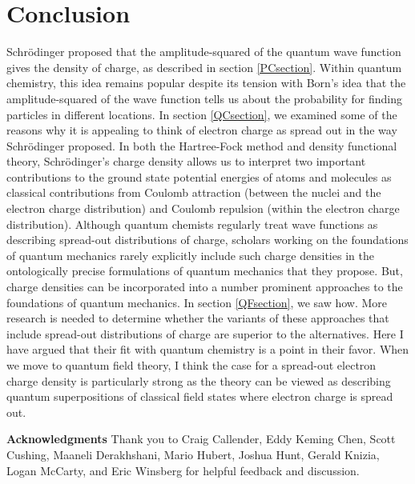 \documentclass[12pt,onecolumn,secnumarabic,amsmath,amssymb,balancelastpage,nofootinbib]{article}
\begin{document}
\section{Conclusion}

Schr\"{o}dinger proposed that the amplitude-squared of the quantum wave function gives the density of charge, as described in section \ref{PCsection}.  Within quantum chemistry, this idea remains popular despite its tension with Born's idea that the amplitude-squared of the wave function tells us about the probability for finding particles in different locations.  In section \ref{QCsection}, we examined some of the reasons why it is appealing to think of electron charge as spread out in the way Schr\"{o}dinger proposed.  In both the Hartree-Fock method and density functional theory, Schr\"{o}dinger's charge density allows us to interpret two important contributions to the ground state potential energies of atoms and molecules as classical contributions from Coulomb attraction (between the nuclei and the electron charge distribution) and Coulomb repulsion (within the electron charge distribution).  Although quantum chemists regularly treat wave functions as describing spread-out distributions of charge, scholars working on the foundations of quantum mechanics rarely explicitly include such charge densities in the ontologically precise formulations of quantum mechanics that they propose.  But, charge densities can be incorporated into a number prominent approaches to the foundations of quantum mechanics.  In section \ref{QFsection}, we saw how.  More research is needed to determine whether the variants of these approaches that include spread-out distributions of charge are superior to the alternatives.  Here I have argued that their fit with quantum chemistry is a point in their favor.  When we move to quantum field theory, I think the case for a spread-out electron charge density is particularly strong as the theory can be viewed as describing quantum superpositions of classical field states where electron charge is spread out.

\vspace*{12 pt}
\noindent
\textbf{Acknowledgments}
Thank you to Craig Callender, Eddy Keming Chen, Scott Cushing, Maaneli Derakhshani, Mario Hubert, Joshua Hunt, Gerald Knizia, Logan McCarty, and Eric Winsberg for helpful feedback and discussion.
\end{document}

